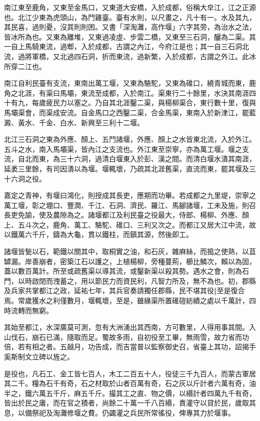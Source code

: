 \begin{pinyinscope}
 南江東至鹿角，又東至金馬口，又東道大安橋，入於成都，俗稱大皁江，江之正源也。北江少東為虎頭山，為鬥雞臺。臺有水則，以尺畫之，凡十有一。水及其九，其民喜，過則憂，沒其則則困。又書「深淘灘，高作堰」六字其旁，為治水之法，皆冰所為也。又東為離堆，又東過凌虛、步雲二橋，又東至三石洞，釃為二渠。其一自上馬騎東流，過郫，入於成都，古謂之內江，今府江是也；其一自三石洞北流，過將軍橋，又北過四石洞，折而東流，過新繁，入於成都，古謂之外江。此冰所穿二江也。



 南江自利民臺有支流，東南出萬工堰，又東為駱駝，又東為碓口，繞青城而東，鹿角之北涯，有渠曰馬壩，東流至成都，入於南江。渠東行二十餘里，水決其南涯四十有九，每歲疲民力以塞之。乃自其北涯鑿二渠，與楊柳渠合，東行數十里，復與馬壩渠會，而渠成安流。自金馬口之西鑿二渠，合金馬渠，東南入於新津江，罷藍澱、黃水、千金、白水、新興至三利十二堰。



 北江三石洞之東為外應、顏上、五鬥諸堰，外應、顏上之水皆東北流，入於外江。五斗之水，南入馬壩渠，皆內江之支流也。外江東至崇寧，亦為萬工堰。堰之支流，自北而東，為三十六洞，過清白堰東入於彭、漢之間。而清白堰水潰其南涯，延袤三里餘，有司因潰以為堰。堰輒壞，乃疏其北涯舊渠，直流而東，罷其堰及三十六洞之役。



 嘉定之青神，有堰曰鴻化，則授成其長吏，應期而功畢。若成都之九里堤，崇寧之萬工堰，彰之堋口、豐潤、千江、石洞、濟民、羅江、馬腳諸堰，工未及施，則召長吏免諭，使及農隙為之。諸堰都江及利民臺之役最大，侍郎、楊柳、外應、顏上、五斗次之，鹿角、萬工、駱駝、碓口、三利又次之。而都江又居大江中流，故以鐵萬六千斤，鑄為大龜，貫以鐵柱，而鎮其源，然後即工。



 諸堰皆甃以石，範鐵以關其中，取桐實之油，和石灰，雜麻絲，而搗之使熟，以苴罅漏。岸善崩者，密築江石以護之，上植楊柳，旁種蔓荊，櫛比鱗次，賴以為固，蓋以數百萬計。所至或疏舊渠以導其流，或鑿新渠以殺其勢。遇水之會，則為石門，以時啟閉而洩蓄之，用以節民力而資民利，凡智力所及，無不為也。初，郡縣及兵家共掌都江之政，延祐七年，其兵官奏請獨任郡縣，民不堪其役‖至是復合焉。常歲獲水之利僅數月，堰輒壞，至是，雖緣渠所置碓磑紡績之處以千萬計，四時流轉而無窮。



 其始至都江，水深廣莫可測，忽有大洲湧出其西南，方可數里，人得用事其間。入山伐石，崩石已滿，隨取而足。蜀故多雨，自初役至工畢，無雨雪，故力省而功倍，若有相之者。五越月，功告成，而吉當普以監察御史召，省臺上其功，詔揭手奚斯制文立碑以旌之。



 是役也，凡石工、金工皆七百人，木工二百五十人，役徒三千九百人，而蒙古軍居其二千。糧為石千有奇，石之材取於山者百萬有奇，石之灰以斤計者六萬有奇，油半之，鐵六萬五千斤，麻五千斤。撮其工之直、物之價，以緡計者四萬九千有奇，皆出於民之庸，而在官之積者，尚餘二十萬一千八百緡，責灌守以貸於民，歲取其息，以備祭祀及淘灘修堰之費。仍蠲灌之兵民所常徭役，俾專其力於堰事。




\end{pinyinscope}
